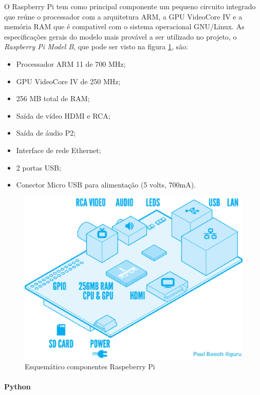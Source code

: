 O Raspberry Pi tem como principal componente um pequeno circuito integrado que reúne o processador com a arquitetura ARM, a GPU VideoCore IV e a memória RAM que é compativel com o sistema operacional GNU/Linux. As especificações gerais do modelo mais provável a ser utilizado no projeto, o \textit{Raspberry Pi Model B}, que pode ser visto na figura \ref{fig:rasp}, são:

\begin{itemize}
 \item Processador ARM 11 de 700 MHz;
 \item GPU VideoCore IV de 250 MHz;
 \item 256 MB total de RAM;
 \item Saída de vídeo HDMI e RCA;
 \item Saída de áudio P2;
 \item Interface de rede Ethernet;
 \item 2 portas USB;
 \item Conector Micro USB para alimentação (5 volts, 700mA).
\end{itemize}

\begin{figure}[!htb]
\centering
  \includegraphics[keepaspectratio=true,scale=0.6]{figuras/controle/blueprint_rasp}
\caption{Esquemático componentes Raspeberry Pi}
\label{fig:rasp}
\end{figure}

\paragraph{Python}

